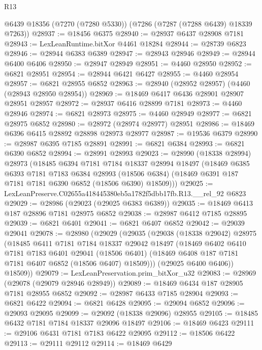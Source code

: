 \begin{lexlean}{R13}
\begin{coremodule}
    @6439
    @18356
    (@7270 (@7280 @5330))
    (@7286 (@7287 (@7288 @6439) @18339 @7263))
@28937 := @18456 @6375
@28940 := @28937 @6437 @28908 @7181
@28943 := LexLeanRuntime.bitXor @4461 @18284
@28944 := @28739 @6823
@28946 := @28944 @6383 @6389
@28947 := @28943 @28946
@28949 := @28944 @6400 @6406
@28950 := @28947 @28949
@28951 := @4460 @28950
@28952 := @6821 @28951
@28954 := @28944 @6421 @6427
@28955 := @4460 @28954
@28957 := @6821 @28955 @6852
@28963 := @28940 (@28952 @28957) (@4460 (@28943 @28950 @28954))
@28969 := @18469 @6417 @6436 @28901 @28907 @28951 @28957
@28972 := @28937 @6416 @28899 @7181
@28973 := @4460 @28946
@28974 := @6821 @28973
@28975 := @4460 @28949
@28977 := @6821 @28975 @6852
@28980 := @28972 (@28974 @28977) @28951
@28986 := @18469 @6396 @6415 @28892 @28898 @28973 @28977
@28987 := @19536 @6379
@28990 := @28987 @6395 @7185 @28891
@28991 := @6821 @6384
@28993 := @6821 @6390 @6852
@28994 := @28991 @28993
@29023 := @28990
    (@18338 @28994)
    @28973
    (@18485
      @6394
      @7181
      @7184
      @18337
      @28994
      @18497
      (@18469
        @6385
        @6393
        @7181
        @7183
        @6384
        @28993
        (@18506 @6384)
        (@18469 @6391 @187 @7181 @7181 @6390 @6852 (@18506 @6390) @18509)))
@29025 := LexLeanPreserve.C02655a418445380eb5a1782f5dbb17fb.R13.__rel_92 @6823
@29029 := @28986 (@29023 (@29025 @6383 @6389))
@29035 := @18469 @6413 @187 @28896 @7181 @28975 @6852
@29038 := @28987 @6412 @7185 @28895
@29039 := @6821 @6401
@29041 := @6821 @6407 @6852
@29042 := @29039 @29041
@29078 := @28980
    (@29029
      (@29035
        (@29038
          (@18338 @29042)
          @28975
          (@18485
            @6411
            @7181
            @7184
            @18337
            @29042
            @18497
            (@18469
              @6402
              @6410
              @7181
              @7183
              @6401
              @29041
              (@18506 @6401)
              (@18469 @6408 @187 @7181 @7181 @6407 @6852 (@18506 @6407) @18509)))
          (@29025 @6400 @6406))
        @18509))
@29079 := LexLeanPreservation.prim_bitXor_u32
@29083 := @28969 (@29078 (@29079 @28946 @28949))
@29089 := @18469 @6434 @187 @28905 @7181 @28955 @6852
@29092 := @28987 @6433 @7185 @28904
@29093 := @6821 @6422
@29094 := @6821 @6428
@29095 := @29094 @6852
@29096 := @29093 @29095
@29099 := @29092 (@18338 @29096) @28955
@29105 := @18485 @6432 @7181 @7184 @18337 @29096 @18497
@29106 := @18469 @6423
@29111 := @29106 @6431 @7181 @7183 @6422 @29095
@29112 := @18506 @6422
@29113 := @29111 @29112
@29114 := @18469 @6429

\end{coremodule}
\end{lexlean}
